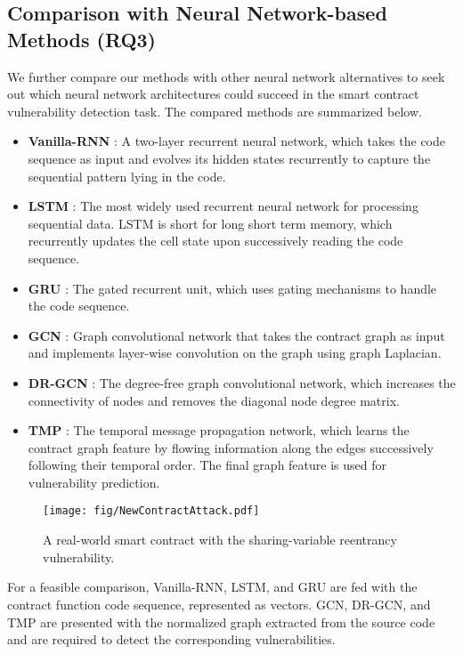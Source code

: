 \subsection{Comparison with Neural Network-based Methods (RQ3)} 
We further compare our methods with other neural network alternatives to seek out which neural network architectures could succeed in the smart contract vulnerability detection task. The compared methods are summarized below.
\begin{itemize}[noitemsep,wide=0pt, leftmargin=\dimexpr{} + 2\relax]
 \item \textbf{Vanilla-RNN} \cite{Vanilla-RNN}: A two-layer recurrent neural network, which takes the code sequence as input and evolves its hidden states recurrently to capture the sequential pattern lying in the code.
 \item \textbf{LSTM} \cite{LSTM}: The most widely used recurrent neural network for processing sequential data. LSTM is short for long short term memory, which recurrently updates the cell state upon successively reading the code sequence.
 \item \textbf{GRU} \cite{GRU}: The gated recurrent unit, which uses gating mechanisms to handle the code sequence.
 \item \textbf{GCN} \cite{GCN}: Graph convolutional network that takes the contract graph as input and implements layer-wise convolution on the graph using  graph Laplacian.
\item \textbf{DR-GCN} \cite{ijcai}: The degree-free graph convolutional network, which increases the connectivity of nodes and removes the diagonal node degree matrix.
 \item \textbf{TMP} \cite{ijcai}: The temporal message propagation network, which learns the contract graph feature by flowing information along the edges successively following their temporal order. The final graph feature is used for vulnerability prediction.
\end{itemize}

 \begin{figure}
 	\centering
 	\texttt{[image: fig/NewContractAttack.pdf]}
 	\caption{A real-world smart contract with the sharing-variable reentrancy vulnerability.}
 	\label{fig:sharingvariable}
	 \vspace{-0.8em}
\end{figure} 

For a feasible comparison, Vanilla-RNN, LSTM, and GRU are fed with the contract function code sequence, represented as vectors. GCN, DR-GCN, and TMP are presented with the normalized graph extracted from the source code and are required to detect the corresponding vulnerabilities. 

